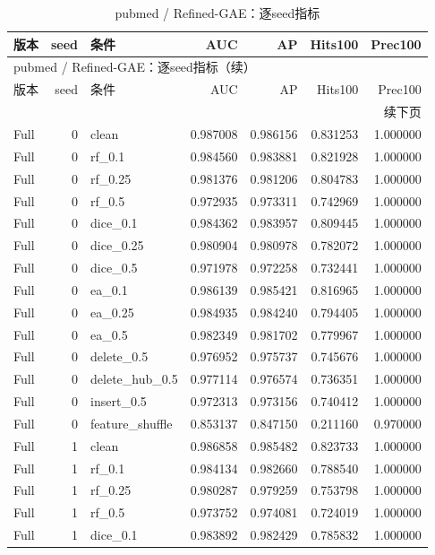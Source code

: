 \documentclass[UTF8,a4paper,11pt,fontset=fandol]{ctexart}
\begin{document}
{\footnotesize
\setlength{\tabcolsep}{3pt}
\begin{longtable}{lrlrrrr}
\caption{pubmed / Refined-GAE：逐seed指标}\\
\toprule
版本 & seed & 条件 & AUC & AP & Hits100 & Prec100 \\
\midrule
\endfirsthead
\multicolumn{7}{l}{pubmed / Refined-GAE：逐seed指标（续）}\\
\toprule
版本 & seed & 条件 & AUC & AP & Hits100 & Prec100 \\
\midrule
\endhead
\midrule\multicolumn{7}{r}{续下页}\\
\endfoot
\bottomrule\endlastfoot
Full & 0 & clean & 0.987008 & 0.986156 & 0.831253 & 1.000000 \\
Full & 0 & rf\_0.1 & 0.984560 & 0.983881 & 0.821928 & 1.000000 \\
Full & 0 & rf\_0.25 & 0.981376 & 0.981206 & 0.804783 & 1.000000 \\
Full & 0 & rf\_0.5 & 0.972935 & 0.973311 & 0.742969 & 1.000000 \\
Full & 0 & dice\_0.1 & 0.984362 & 0.983957 & 0.809445 & 1.000000 \\
Full & 0 & dice\_0.25 & 0.980904 & 0.980978 & 0.782072 & 1.000000 \\
Full & 0 & dice\_0.5 & 0.971978 & 0.972258 & 0.732441 & 1.000000 \\
Full & 0 & ea\_0.1 & 0.986139 & 0.985421 & 0.816965 & 1.000000 \\
Full & 0 & ea\_0.25 & 0.984935 & 0.984240 & 0.794405 & 1.000000 \\
Full & 0 & ea\_0.5 & 0.982349 & 0.981702 & 0.779967 & 1.000000 \\
Full & 0 & delete\_0.5 & 0.976952 & 0.975737 & 0.745676 & 1.000000 \\
Full & 0 & delete\_hub\_0.5 & 0.977114 & 0.976574 & 0.736351 & 1.000000 \\
Full & 0 & insert\_0.5 & 0.972313 & 0.973156 & 0.740412 & 1.000000 \\
Full & 0 & feature\_shuffle & 0.853137 & 0.847150 & 0.211160 & 0.970000 \\
Full & 1 & clean & 0.986858 & 0.985482 & 0.823733 & 1.000000 \\
Full & 1 & rf\_0.1 & 0.984134 & 0.982660 & 0.788540 & 1.000000 \\
Full & 1 & rf\_0.25 & 0.980287 & 0.979259 & 0.753798 & 1.000000 \\
Full & 1 & rf\_0.5 & 0.973752 & 0.974081 & 0.724019 & 1.000000 \\
Full & 1 & dice\_0.1 & 0.983892 & 0.982429 & 0.785832 & 1.000000 \\

\end{longtable}}
\end{document}

